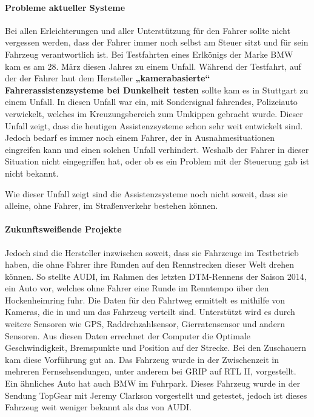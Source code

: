 \paragraph{Probleme aktueller Systeme} Bei allen Erleichterungen und aller Unterstützung für den Fahrer sollte nicht vergessen werden, dass der Fahrer immer noch selbst am Steuer sitzt und für sein Fahrzeug verantwortlich ist. Bei Testfahrten eines Erlkönigs der Marke BMW kam es am 28. März diesen Jahres zu einem Unfall. Während der Testfahrt, auf der der Fahrer laut dem Hersteller \textbf{„kamerabasierte“ Fahrerassistenzsysteme bei Dunkelheit testen} sollte kam es in Stuttgart zu einem Unfall. In diesen Unfall war ein, mit Sondersignal fahrendes, Polizeiauto verwickelt, welches im Kreuzungsbereich zum Umkippen gebracht wurde.
Dieser Unfall zeigt, dass die heutigen Assistenzsysteme schon sehr weit entwickelt sind. Jedoch bedarf es immer noch einem Fahrer, der in Ausnahmesituationen eingreifen kann und einen solchen Unfall verhindert. Weshalb der Fahrer in dieser Situation nicht eingegriffen hat, oder ob es ein Problem mit der Steuerung gab ist nicht bekannt.

Wie dieser Unfall zeigt sind die Assistenzsysteme noch nicht soweit, dass sie alleine, ohne Fahrer, im Straßenverkehr bestehen können. 

\paragraph{Zukunftsweißende Projekte} Jedoch sind die Hersteller inzwischen soweit, dass sie Fahrzeuge im Testbetrieb haben, die ohne Fahrer ihre Runden auf den Rennstrecken dieser Welt drehen können. So stellte AUDI, im Rahmen des letzten DTM-Rennens der Saison 2014, ein Auto vor, welches ohne Fahrer eine Runde im Renntempo über den Hockenheimring fuhr. Die Daten für den Fahrtweg ermittelt es mithilfe von Kameras, die in und um das Fahrzeug verteilt sind. Unterstützt wird es durch weitere Sensoren wie GPS, Raddrehzahlsensor, Gierratensensor und andern Sensoren. Aus diesen Daten errechnet der Computer die Optimale Geschwindigkeit, Bremspunkte und Position auf der Strecke. Bei den Zuschauern kam diese Vorführung gut an. Das Fahrzeug wurde in der Zwischenzeit in mehreren Fernsehsendungen, unter anderem bei GRIP auf RTL II, vorgestellt. 
Ein ähnliches Auto hat auch BMW im Fuhrpark. Dieses Fahrzeug wurde in der Sendung TopGear mit Jeremy Clarkson vorgestellt und getestet, jedoch ist dieses Fahrzeug weit weniger bekannt als das von AUDI.

